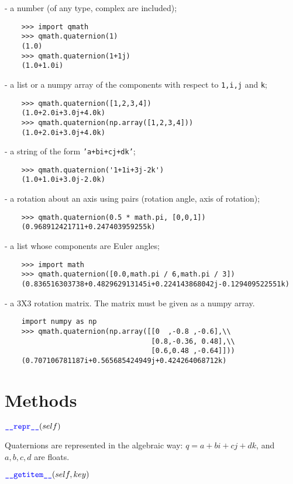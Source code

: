 \documentclass[11pt]{paper}
\begin{document}
\noindent - a number (of any type, complex are included);
\begin{verbatim}
    >>> import qmath
    >>> qmath.quaternion(1)
    (1.0)
    >>> qmath.quaternion(1+1j)
    (1.0+1.0i)
\end{verbatim}
\noindent - a list or a numpy array of the components with respect to \texttt{1,i,j} and \texttt{k}; 
\begin{verbatim}
    >>> qmath.quaternion([1,2,3,4])
    (1.0+2.0i+3.0j+4.0k)
    >>> qmath.quaternion(np.array([1,2,3,4]))
    (1.0+2.0i+3.0j+4.0k)
\end{verbatim}
\noindent - a string of the form \texttt{'a+bi+cj+dk'};
\begin{verbatim}
    >>> qmath.quaternion('1+1i+3j-2k')
    (1.0+1.0i+3.0j-2.0k)
\end{verbatim}
\noindent - a rotation about an axis using pairs (rotation angle, axis of rotation);
\begin{verbatim}
    >>> qmath.quaternion(0.5 * math.pi, [0,0,1])
    (0.968912421711+0.247403959255k)
\end{verbatim}


\noindent - a list whose components are Euler angles;
\begin{verbatim}
    >>> import math
    >>> qmath.quaternion([0.0,math.pi / 6,math.pi / 3])
    (0.836516303738+0.482962913145i+0.224143868042j-0.129409522551k)
\end{verbatim}
\noindent - a 3X3 rotation matrix. The matrix must be given as a numpy array.
\begin{verbatim}
    import numpy as np
    >>> qmath.quaternion(np.array([[0  ,-0.8 ,-0.6],\\
                                   [0.8,-0.36, 0.48],\\
                                   [0.6,0.48 ,-0.64]]))
    (0.707106781187i+0.565685424949j+0.424264068712k)
\end{verbatim}        
    
\bigskip

\section{Methods}
\noindent $\textcolor{blue}{\texttt{\_\_repr\_\_}}(self)$ 

Quaternions are represented in the algebraic way: $q = a+bi+cj+dk$, and $a,b,c,d$ are floats.

\medskip
 
\noindent $\textcolor{blue}{\texttt{\_\_\mbox{getitem}\_\_}}(self,key)$
\end{document}
